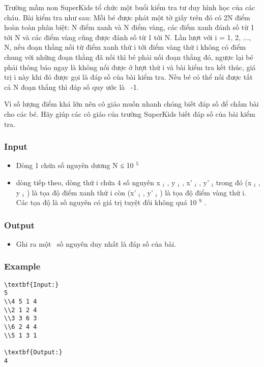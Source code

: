



   Trường mầm non SuperKids tổ chức một buổi kiểm tra tư duy hình học của các cháu. Bài kiểm tra như sau: Mỗi bé được phát một tờ giấy trên đó có 2N điểm hoàn toàn phân biệt: N điểm xanh và N điểm vàng, các điểm xanh đánh số từ 1 tới N và các điểm vàng cũng được đánh số từ 1 tới N. Lần lượt với i = 1, 2, ..., N, nếu đoạn thẳng nối từ điểm xanh thứ i tới điểm vàng thứ i không có điểm chung với những đoạn thẳng đã nối thì bé phải nối đoạn thẳng đó, ngược lại bé phải thông báo ngay là không nối được ở lượt thứ i và bài kiểm tra kết thúc, giá trị i này khi đó được gọi là đáp số của bài kiểm tra. Nếu bé có thể nối được tất cả N đoạn thẳng thì đáp số quy ước là  -1.  

   Vì số lượng điểm khá lớn nên cô giáo muốn nhanh chóng biết đáp số để chấm bài cho các bé. Hãy giúp các cô giáo của trường SuperKids biết đáp số của bài kiểm tra.  

\subsubsection{   Input  }
\begin{itemize}
	\item     Dòng 1 chứa số nguyên dương N ≤ 10    $^     5    $
	\item     dòng tiếp theo, dòng thứ i chứa 4 số nguyên x    $_     i    $    , y    $_     i    $    , x'    $_     i    $    , y'    $_     i    $    trong đó (x    $_     i    $    , y    $_     i    $    ) là tọa độ điểm xanh thứ i còn (x'    $_     i    $    , y'    $_     i    $    ) là tọa độ điểm vàng thứ i. Các tọa độ là số nguyên có giá trị tuyệt đối không quá 10    $^     9    $    .   
\end{itemize}

\subsubsection{   Output  }
\begin{itemize}
	\item     Ghi ra một  số nguyên duy nhất là đáp số của bài.   
\end{itemize}

\subsubsection{   Example  }
\begin{verbatim}
\textbf{Input:}
5 
\\4 5 1 4 
\\2 1 2 4 
\\3 3 6 3 
\\6 2 4 4 
\\5 1 3 1

\textbf{Output:}
4
\end{verbatim}